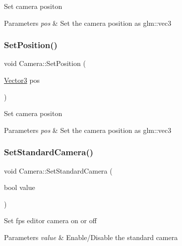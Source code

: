 Set camera positon 
\begin{DoxyParams}{Parameters}
{\em pos} & Set the camera position as glm\+::vec3 \\
\hline
\end{DoxyParams}
\mbox{\label{class_camera_a29b98609f90350c109ea8b5da97ed283}} 
\subsubsection{\texorpdfstring{SetPosition()}{SetPosition()}\hspace{0.1cm}{\footnotesize\ttfamily [2/2]}}
{\footnotesize\ttfamily void Camera\+::\+Set\+Position (\begin{DoxyParamCaption}\item[{\mbox{\hyperlink{struct_vector3}{Vector3}}}]{pos }\end{DoxyParamCaption})}

Set camera positon 
\begin{DoxyParams}{Parameters}
{\em pos} & Set the camera position as glm\+::vec3 \\
\hline
\end{DoxyParams}
\mbox{\label{class_camera_ab0864f4ba7ba25be835288179b253a7d}} 
\subsubsection{\texorpdfstring{SetStandardCamera()}{SetStandardCamera()}}
{\footnotesize\ttfamily void Camera\+::\+Set\+Standard\+Camera (\begin{DoxyParamCaption}\item[{bool}]{value }\end{DoxyParamCaption})}

Set fps editor camera on or off 
\begin{DoxyParams}{Parameters}
{\em value} & Enable/\+Disable the standard camera \\
\hline
\end{DoxyParams}
\mbox{\label{class_camera_a0b99b533cd3fb1fd194f824fb598d7d7}} 
